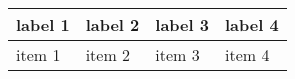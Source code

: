 

\usepackage{tabularx}

\begin{tabularx}{\textwidth}{ |X|X|X|X| }
  \hline
  label 1 & label 2 & label 3 & label 4 \\
  \hline
  item 1  & item 2  & item 3  & item 4  \\
  \hline
\end{tabularx}
